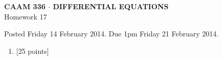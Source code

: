\documentclass[10pt]{article}
\begin{document}
\vspace*{-5em}
\begin{center}
\large \textsf{\textbf{CAAM 336 $\cdot$ DIFFERENTIAL EQUATIONS}\\[0.5em]
Homework 17 }
\end{center}

Posted Friday 14 February 2014.  Due 1pm Friday 21 February 2014.

\begin{enumerate}\addtocounter{enumi}{16}
\item {[25 points]}  
\end{enumerate}
\end{document}

